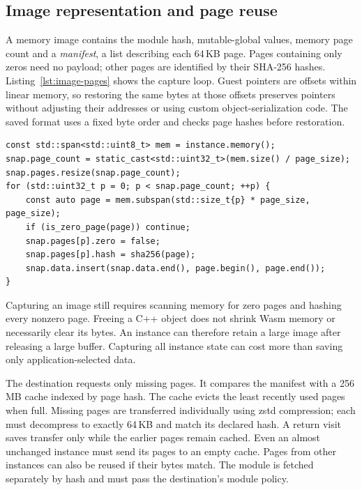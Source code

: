 
\subsection{Image representation and page reuse}\label{sec:movement-image}

A memory image contains the module hash, mutable-global values, memory
page count and a \emph{manifest}, a list describing each 64\,KB page.
Pages containing only zeros need no payload; other pages are identified
by their SHA-256 hashes. Listing~\ref{lst:image-pages} shows the capture
loop. Guest pointers are offsets within linear memory, so restoring the
same bytes at those offsets preserves pointers without adjusting their
addresses or using custom object-serialization code. The saved format
uses a fixed byte order and checks page hashes before restoration.

\begin{lstlisting}[style=paglets-cpp,caption={Capturing memory without interpreting application objects \src{cpp/host/src/wasm\_snapshot.cpp}},label={lst:image-pages}]
const std::span<std::uint8_t> mem = instance.memory();
snap.page_count = static_cast<std::uint32_t>(mem.size() / page_size);
snap.pages.resize(snap.page_count);
for (std::uint32_t p = 0; p < snap.page_count; ++p) {
    const auto page = mem.subspan(std::size_t{p} * page_size, page_size);
    if (is_zero_page(page)) continue;
    snap.pages[p].zero = false;
    snap.pages[p].hash = sha256(page);
    snap.data.insert(snap.data.end(), page.begin(), page.end());
}
\end{lstlisting}

Capturing an image still requires scanning memory for zero pages and
hashing every nonzero page. Freeing a C++ object does not shrink Wasm
memory or necessarily clear its bytes. An instance can therefore retain
a large image after releasing a large buffer. Capturing all instance
state can cost more than saving only application-selected data.

The destination requests only missing pages. It compares the manifest
with a 256\,MB cache indexed by page hash. The cache evicts the least
recently used pages when full. Missing pages are transferred individually
using zstd compression; each must decompress to exactly 64\,KB and match
its declared hash. A return visit saves transfer only while the earlier
pages remain cached. Even an almost unchanged instance must send its
pages to an empty cache. Pages from other instances can also be reused
if their bytes match. The module is fetched separately by hash and must
pass the destination's module policy.

